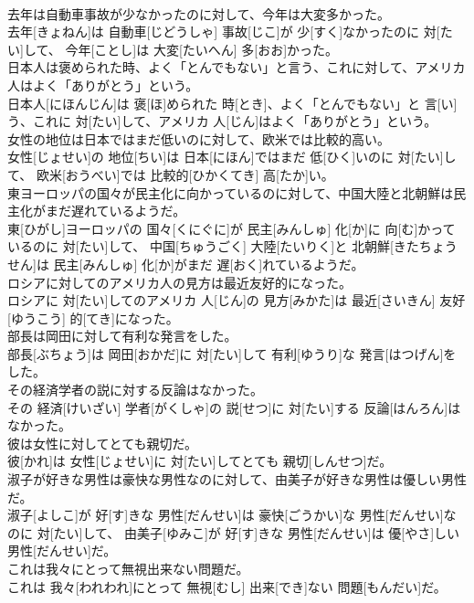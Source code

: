 \documentclass[8pt]{extreport}
\begin{document}
\begin{CJK}{UTF8}{min}
\\	去年は自動車事故が少なかったのに対して、今年は大変多かった。	
\\	去年[きょねん]は 自動車[じどうしゃ] 事故[じこ]が 少[すく]なかったのに 対[たい]して、 今年[ことし]は 大変[たいへん] 多[おお]かった。
\\	日本人は褒められた時、よく「とんでもない」と言う、これに対して、アメリカ人はよく「ありがとう」という。	
\\	日本人[にほんじん]は 褒[ほ]められた 時[とき]、よく「とんでもない」と 言[い]う、これに 対[たい]して、アメリカ 人[じん]はよく「ありがとう」という。
\\	女性の地位は日本ではまだ低いのに対して、欧米では比較的高い。	
\\	女性[じょせい]の 地位[ちい]は 日本[にほん]ではまだ 低[ひく]いのに 対[たい]して、 欧米[おうべい]では 比較的[ひかくてき] 高[たか]い。
\\	東ヨーロッパの国々が民主化に向かっているのに対して、中国大陸と北朝鮮は民主化がまだ遅れているようだ。	
\\	東[ひがし]ヨーロッパの 国々[くにぐに]が 民主[みんしゅ] 化[か]に 向[む]かっているのに 対[たい]して、 中国[ちゅうごく] 大陸[たいりく]と 北朝鮮[きたちょうせん]は 民主[みんしゅ] 化[か]がまだ 遅[おく]れているようだ。
\\	ロシアに対してのアメリカ人の見方は最近友好的になった。	
\\	ロシアに 対[たい]してのアメリカ 人[じん]の 見方[みかた]は 最近[さいきん] 友好[ゆうこう] 的[てき]になった。
\\	部長は岡田に対して有利な発言をした。	
\\	部長[ぶちょう]は 岡田[おかだ]に 対[たい]して 有利[ゆうり]な 発言[はつげん]をした。
\\	その経済学者の説に対する反論はなかった。	
\\	その 経済[けいざい] 学者[がくしゃ]の 説[せつ]に 対[たい]する 反論[はんろん]はなかった。
\\	彼は女性に対してとても親切だ。	
\\	彼[かれ]は 女性[じょせい]に 対[たい]してとても 親切[しんせつ]だ。
\\	淑子が好きな男性は豪快な男性なのに対して、由美子が好きな男性は優しい男性だ。	
\\	淑子[よしこ]が 好[す]きな 男性[だんせい]は 豪快[ごうかい]な 男性[だんせい]なのに 対[たい]して、 由美子[ゆみこ]が 好[す]きな 男性[だんせい]は 優[やさ]しい 男性[だんせい]だ。
\\	これは我々にとって無視出来ない問題だ。	
\\	これは 我々[われわれ]にとって 無視[むし] 出来[でき]ない 問題[もんだい]だ。

\end{CJK}
\end{document}
